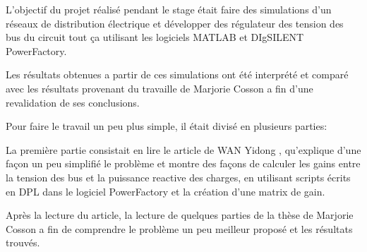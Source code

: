 L'objectif du projet réalisé pendant le stage était faire des simulations d'un réseaux de distribution électrique et développer des régulateur des tension des bus du circuit tout ça utilisant les logiciels MATLAB et DIgSILENT PowerFactory.

Les résultats obtenues a partir de ces simulations ont été interprété et comparé avec les résultats provenant du travaille de Marjorie Cosson \cite{cosson:tel-01374469} a fin d'une revalidation de ses conclusions.   

Pour faire le travail un peu plus simple, il était divisé en plusieurs parties:

La première partie consistait en lire le article de WAN Yidong \cite{yidong}, qu'explique d'une façon un peu simplifié le problème et montre des façons de calculer les gains entre la tension des bus et la puissance reactive des charges, en utilisant scripts écrits en \gls{DPL} dans le logiciel PowerFactory et la création d'une matrix de gain.

Après la lecture du article, la lecture de quelques parties de la thèse de Marjorie Cosson \cite{cosson:tel-01374469} a fin de comprendre le problème un peu meilleur   proposé et les résultats trouvés. 

